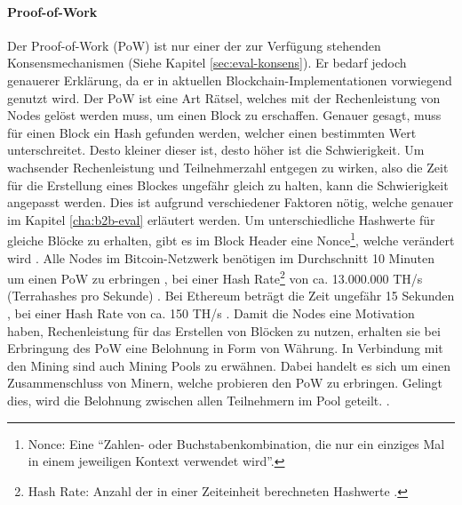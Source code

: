 \paragraph{Proof-of-Work}
Der Proof-of-Work (PoW) ist nur einer der zur Verfügung stehenden Konsensmechanismen (Siehe Kapitel \ref{sec:eval-konsens}). Er bedarf jedoch genauerer Erklärung, da er in aktuellen Blockchain-Implementationen vorwiegend genutzt wird. Der PoW ist eine Art Rätsel, welches mit der Rechenleistung von Nodes gelöst werden muss, um einen Block zu erschaffen. Genauer gesagt, muss für einen Block ein Hash gefunden werden, welcher einen bestimmten Wert unterschreitet. Desto kleiner dieser ist, desto höher ist die Schwierigkeit. Um wachsender Rechenleistung und Teilnehmerzahl entgegen zu wirken, also die Zeit für die Erstellung eines Blockes ungefähr gleich zu halten, kann die Schwierigkeit angepasst werden. Dies ist aufgrund verschiedener Faktoren nötig, welche genauer im Kapitel \ref{cha:b2b-eval} erläutert werden. Um unterschiedliche Hashwerte für gleiche Blöcke zu erhalten, gibt es im Block Header eine Nonce\footnote{Nonce: Eine ``Zahlen- oder Buchstabenkombination, die nur ein einziges Mal in einem jeweiligen Kontext verwendet wird''\cite{AntonopoulosMasteringbitcoin2015}.}, welche verändert wird \cite{NakamotoBitcoinPeertoPeerElectronic2008}. Alle Nodes im Bitcoin-Netzwerk benötigen im Durchschnitt 10 Minuten um einen PoW zu erbringen \cite{AntonopoulosMasteringbitcoin2015}, bei einer Hash Rate\footnote{Hash Rate: Anzahl der in einer Zeiteinheit berechneten Hashwerte \cite{BitcoinTeamBitcoinGlossar}.} von ca. 13.000.000 TH/s (Terrahashes pro Sekunde) \cite{EtherscanEthereumNetworkHashRate}. Bei Ethereum beträgt die Zeit ungefähr 15 Sekunden \cite{EtherscanEthereumAverageBlockTime}, bei einer Hash Rate von ca. 150 TH/s \cite{EtherscanEthereumNetworkHashRate}. Damit die Nodes eine Motivation haben, Rechenleistung für das Erstellen von Blöcken zu nutzen, erhalten sie bei Erbringung des PoW eine Belohnung in Form von Währung. In Verbindung mit den Mining sind auch Mining Pools zu erwähnen. Dabei handelt es sich um einen Zusammenschluss von Minern, welche probieren den PoW zu erbringen. Gelingt dies, wird die Belohnung zwischen allen Teilnehmern im Pool geteilt.  \cite{NakamotoBitcoinPeertoPeerElectronic2008} \cite{EthereumTeamEthereumWhitePaper2017}. 

